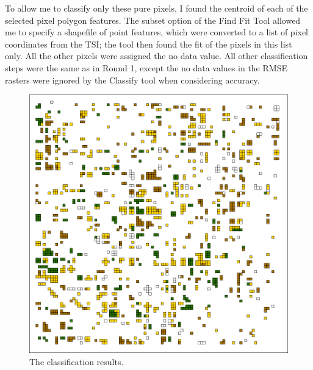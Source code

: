 To allow me to classify only these pure pixels, I found the centroid of each of the selected pixel polygon features. The subset option of the Find Fit Tool allowed me to specify a shapefile of point features, which were converted to a list of pixel coordinates from the TSI; the tool then found the fit of the pixels in this list only. All the other pixels were assigned the no data value. All other classification steps were the same as in Round 1, except the no data values in the RMSE rasters were ignored by the Classify tool when considering accuracy.

\begin{ssfigure}
  \centering
  \begin{subfigure}[t]{.63\textwidth}
    \includegraphics[width=\textwidth]{Graphics/Testing/clip1_MODIS_round2.pdf}
    \caption{The classification results.}
    \label{subfig:ss1r2class}
  \end{subfigure}
  \\
  \vspace{.15in}
  \begin{subfigure}[t]{.63\textwidth}

\end{subfigure}
\end{ssfigure}
